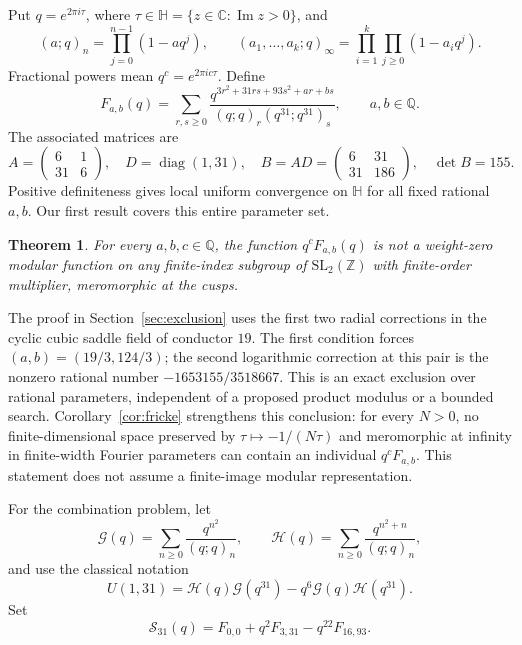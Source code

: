 \documentclass[11pt,reqno]{amsart}
\newcommand{\QQ}{\mathbb Q}
\newcommand{\ZZ}{\mathbb Z}
\newcommand{\HH}{\mathbb H}
\newcommand{\diag}{\operatorname{diag}}
\newcommand{\RG}{\mathcal G}
\newcommand{\RH}{\mathcal H}
\newcommand{\Ssum}{\mathcal S_{31}}
\newtheorem{theorem}{Theorem}[section]
\theoremstyle{remark}
\numberwithin{equation}{section}
\begin{document}
Put $q=e^{2\pi i\tau}$, where
$\tau\in\HH=\{z\in\mathbb C:\operatorname{Im}z>0\}$, and
\[
 (a;q)_n=\prod_{j=0}^{n-1}(1-aq^j),\qquad
 (a_1,\ldots,a_k;q)_\infty=\prod_{i=1}^k\prod_{j\geq0}(1-a_iq^j).
\]
Fractional powers mean $q^c=e^{2\pi i c\tau}$. Define
\begin{equation}\label{eq:family}
 F_{a,b}(q)=\sum_{r,s\geq0}
 \frac{q^{3r^2+31rs+93s^2+ar+bs}}
 {(q;q)_r(q^{31};q^{31})_s},\qquad a,b\in\QQ.
\end{equation}
The associated matrices are
\begin{equation}\label{eq:matrices}
 A=\begin{pmatrix}6&1\\31&6\end{pmatrix},\quad
 D=\diag(1,31),\quad
 B=AD=\begin{pmatrix}6&31\\31&186\end{pmatrix},\quad \det B=155.
\end{equation}
Positive definiteness gives local uniform convergence on $\HH$ for all
fixed rational $a,b$. Our first result covers this entire parameter set.

\begin{theorem}\label{thm:individual}
For every $a,b,c\in\QQ$, the function $q^cF_{a,b}(q)$ is not a
weight-zero modular function on any finite-index subgroup of
$\mathrm{SL}_2(\ZZ)$ with finite-order multiplier, meromorphic at the cusps.
\end{theorem}

The proof in Section~\ref{sec:exclusion} uses the first two radial
corrections in the cyclic cubic saddle field of conductor $19$.
The first condition forces $(a,b)=(19/3,124/3)$; the second logarithmic
correction at this pair is the nonzero rational number
$-1653155/3518667$. This is an exact exclusion over rational parameters,
independent of a proposed product modulus or a bounded search.
Corollary~\ref{cor:fricke} strengthens this conclusion: for every $N>0$,
no finite-dimensional space preserved by $\tau\mapsto-1/(N\tau)$ and
meromorphic at infinity in finite-width Fourier parameters can contain
an individual $q^cF_{a,b}$. This statement does not assume a
finite-image modular representation.

For the combination problem, let
\begin{equation}\label{eq:RR}
 \RG(q)=\sum_{n\geq0}\frac{q^{n^2}}{(q;q)_n},\qquad
 \RH(q)=\sum_{n\geq0}\frac{q^{n^2+n}}{(q;q)_n},
\end{equation}
and use the classical notation \cite{BY}
\begin{equation}\label{eq:U31}
 U(1,31)=\RH(q)\RG(q^{31})-q^6\RG(q)\RH(q^{31}).
\end{equation}
Set
\begin{equation}\label{eq:signed}
 \Ssum(q)=F_{0,0}+q^2F_{3,31}-q^{22}F_{16,93}.
\end{equation}
\end{document}
